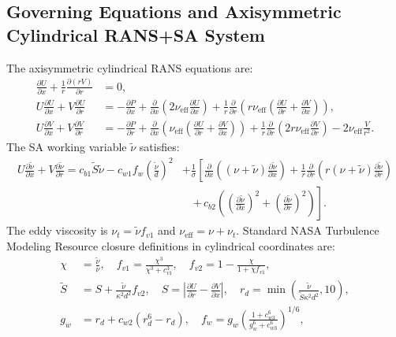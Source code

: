 \documentclass[11pt,a4paper]{article}
\begin{document}
\subsection{Governing Equations and Axisymmetric Cylindrical RANS+SA System}
The axisymmetric cylindrical RANS equations are:
\begin{align}
\label{eq:pipe_rans_cont}
\frac{\partial U}{\partial x} + \frac{1}{r}\frac{\partial (r V)}{\partial r} &= 0, \\
\label{eq:pipe_rans_mom_x}
U \frac{\partial U}{\partial x} + V \frac{\partial U}{\partial r} &= -\frac{\partial P}{\partial x} + \frac{\partial}{\partial x}\left(2\nu_{\mathrm{eff}}\frac{\partial U}{\partial x}\right) + \frac{1}{r}\frac{\partial}{\partial r}\left(r \nu_{\mathrm{eff}}\left(\frac{\partial U}{\partial r} + \frac{\partial V}{\partial x}\right)\right), \\
\label{eq:pipe_rans_mom_r}
U \frac{\partial V}{\partial x} + V \frac{\partial V}{\partial r} &= -\frac{\partial P}{\partial r} + \frac{\partial}{\partial x}\left(\nu_{\mathrm{eff}}\left(\frac{\partial U}{\partial r} + \frac{\partial V}{\partial x}\right)\right) + \frac{1}{r}\frac{\partial}{\partial r}\left(2 r \nu_{\mathrm{eff}}\frac{\partial V}{\partial r}\right) - 2\nu_{\mathrm{eff}}\frac{V}{r^2}.
\end{align}
The SA working variable $\tilde{\nu}$ satisfies:
\begin{equation}
\label{eq:pipe_rans_sa}
\begin{split}
U \frac{\partial \tilde{\nu}}{\partial x} + V \frac{\partial \tilde{\nu}}{\partial r} = c_{b1} \tilde{S} \tilde{\nu} - c_{w1} f_w \left(\frac{\tilde{\nu}}{d}\right)^2 &+ \frac{1}{\sigma}\left[ \frac{\partial}{\partial x}\left((\nu+\tilde{\nu})\frac{\partial \tilde{\nu}}{\partial x}\right) + \frac{1}{r}\frac{\partial}{\partial r}\left(r (\nu+\tilde{\nu})\frac{\partial \tilde{\nu}}{\partial r}\right) \right. \\
&\quad\left. +\, c_{b2}\left(\left(\frac{\partial \tilde{\nu}}{\partial x}\right)^2 + \left(\frac{\partial \tilde{\nu}}{\partial r}\right)^2\right) \right].
\end{split}
\end{equation}
The eddy viscosity is $\nu_t = \tilde{\nu} f_{v1}$ and $\nu_{\mathrm{eff}} = \nu + \nu_t$. Standard NASA Turbulence Modeling Resource closure definitions in cylindrical coordinates are:
\begin{align}
\chi &= \frac{\tilde{\nu}}{\nu}, \quad f_{v1} = \frac{\chi^3}{\chi^3 + c_{v1}^3}, \quad f_{v2} = 1 - \frac{\chi}{1 + \chi f_{v1}}, \\
\tilde{S} &= S + \frac{\tilde{\nu}}{\kappa^2 d^2} f_{v2}, \quad S = \left|\frac{\partial U}{\partial r} - \frac{\partial V}{\partial x}\right|, \quad r_d = \min\left(\frac{\tilde{\nu}}{\tilde{S}\kappa^2 d^2}, 10\right), \\
g_w &= r_d + c_{w2}(r_d^6 - r_d), \quad f_w = g_w \left(\frac{1 + c_{w3}^6}{g_w^6 + c_{w3}^6}\right)^{1/6},
\end{align}
\end{document}
